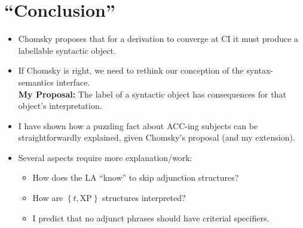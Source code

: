 \documentclass[letterpaper]{article}
\begin{document}
\section{``Conclusion''}
\begin{itemize}
	\item Chomsky proposes that for a derivation to converge at CI it must produce a labellable syntactic object.
	\item If Chomsky is right, we need to rethink our conception of the syntax-semantics interface.\\
	  \textbf{My Proposal:} The label of a syntactic object has consequences for that object's interpretation.
	\item I have shown how a puzzling fact about ACC-ing subjects can be straightforwardly explained, given Chomsky's proposal (and my extension).
	\item Several aspects require more explanation/work:
	  \begin{itemize}
	    \item How does the LA ``know'' to skip adjunction structures?
	    \item How are $\left\{ t, \text{XP} \right\}$ structures interpreted?
	    \item I predict that no adjunct phrases should have criterial specifiers.
	  \end{itemize}
\end{itemize}
\printbibliography
\end{document}
